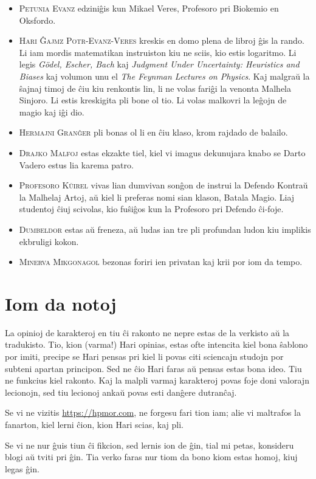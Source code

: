 \begin{itemize}
\item \textsc{Petunia Evanz} edziniĝis kun Mikael Veres, Profesoro pri Biokemio en Oksfordo.
\item \textsc{Hari Ĝajmz Potr-Evanz-Veres} kreskis en domo plena de libroj ĝis la rando. Li iam mordis matematikan instruiston kiu ne sciis, kio estis logaritmo. Li legis \emph{Gödel, Escher, Bach} kaj \emph{Judgment Under Uncertainty: Heuristics and Biases} kaj volumon unu el \emph{The Feynman Lectures on Physics}. Kaj malgraŭ la ŝajnaj timoj de ĉiu kiu renkontis lin, li ne volas fariĝi la venonta Malhela Sinjoro. Li estis kreskigita pli bone ol tio. Li volas malkovri la leĝojn de magio kaj iĝi dio.
\item \textsc{Hermajni Granĝer} pli bonas ol li en ĉiu klaso, krom rajdado de balailo.
\item \textsc{Drajko Malfoj} estas ekzakte tiel, kiel vi imagus dekunujara knabo se Darto Vadero estus lia karema patro.
\item \textsc{Profesoro Kŭirel} vivas lian dumvivan sonĝon de instrui la Defendo Kontraŭ la Malhelaj Artoj, aŭ kiel li preferas nomi sian klason, Batala Magio. Liaj studentoj ĉiuj scivolas, kio fuŝiĝos kun la Profesoro pri Defendo ĉi-foje.
\item \textsc{Dumbeldor} estas aŭ freneza, aŭ ludas ian tre pli profundan ludon kiu implikis ekbruligi kokon.
\item \textsc{Minerva Mikgonagol} bezonas foriri ien privatan kaj krii por iom da tempo.
\end{itemize}

%
%

\section*{Iom da notoj}
La opinioj de karakteroj en tiu ĉi rakonto ne nepre estas de la verkisto aŭ la tradukisto. Tio, kion (varma!) Hari opinias, estas ofte intencita kiel bona ŝablono por imiti, precipe se Hari pensas pri kiel li povas citi sciencajn studojn por subteni apartan principon. Sed ne ĉio Hari faras aŭ pensas estas bona ideo. Tiu ne funkcius kiel rakonto. Kaj la malpli varmaj karakteroj povas foje doni valorajn lecionojn, sed tiu lecionoj ankaŭ povas esti danĝere dutranĉaj.

Se vi ne vizitis \url{https://hpmor.com}, ne forgesu fari tion iam; alie vi maltrafos la fanarton, kiel lerni ĉion, kion Hari scias, kaj pli.

Se vi ne nur ĝuis tiun ĉi fikcion, sed lernis ion de ĝin, tial mi petas, konsideru blogi aŭ tviti pri ĝin. Tia verko faras nur tiom da bono kiom estas homoj, kiuj legas ĝin.

